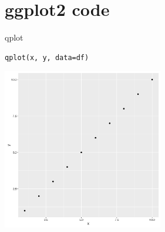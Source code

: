 \documentclass[t,10pt]{beamer}
\begin{document}
\section{ggplot2 code}
\label{sec:orgheadline19}
\begin{frame}[fragile,label={sec:orgheadline10}]{qplot}
 \begin{verbatim}
qplot(x, y, data=df)
\end{verbatim}
\includegraphics[width=7cm,height=7cm]{./plot.png}
\end{frame}
\end{document}
